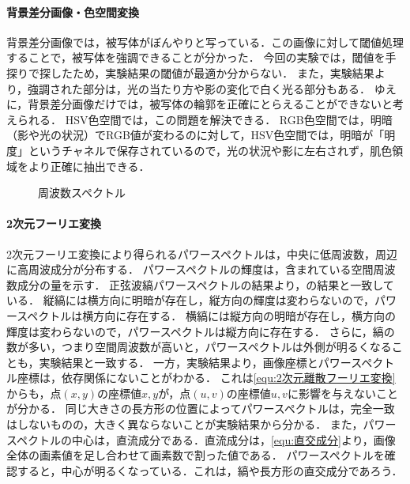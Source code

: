 \paragraph{背景差分画像・色空間変換}
背景差分画像では，被写体がぼんやりと写っている．この画像に対して閾値処理することで，被写体を強調できることが分かった．
今回の実験では，閾値を手探りで探したため，実験結果の閾値が最適か分からない．
また，実験結果より，強調された部分は，光の当たり方や影の変化で白く光る部分もある．
ゆえに，背景差分画像だけでは，被写体の輪郭を正確にとらえることができないと考えられる．
HSV色空間では，この問題を解決できる．
RGB色空間では，明暗（影や光の状況）でRGB値が変わるのに対して，HSV色空間では，明暗が「明度」というチャネルで保存されているので，光の状況や影に左右されず，肌色領域をより正確に抽出できる．
\begin{wrapfigure}{r}[0mm]{.3\textwidth}
    \centering
    \caption{周波数スペクトル}
    \label{fig:周波数スペクトル}
    \vspace{-.5cm}
\end{wrapfigure}
\paragraph{2次元フーリエ変換}
2次元フーリエ変換により得られるパワースペクトルは，中央に低周波数，周辺に高周波成分が分布する．
パワースペクトルの輝度は，含まれている空間周波数成分の量を示す．
正弦波縞パワースペクトルの結果より，の結果と一致している．
縦縞には横方向に明暗が存在し，縦方向の輝度は変わらないので，パワースペクトルは横方向に存在する．
横縞には縦方向の明暗が存在し，横方向の輝度は変わらないので，パワースペクトルは縦方向に存在する．
さらに，縞の数が多い，つまり空間周波数が高いと，パワースペクトルは外側が明るくなることも，実験結果と一致する．
一方，実験結果より，画像座標とパワースペクトル座標は，依存関係にないことがわかる．
これは\eqref{equ:2次元離散フーリエ変換}からも，点\((x,y)\)の座標値\(x,y\)が，点\((u,v)\)の座標値\(u,v\)に影響を与えないことが分かる．
同じ大きさの長方形の位置によってパワースペクトルは，完全一致はしないものの，大きく異ならないことが実験結果から分かる．
また，パワースペクトルの中心は，直流成分である．直流成分は，\eqref{equ:直交成分}より，画像全体の画素値を足し合わせて画素数で割った値である．
パワースペクトルを確認すると，中心が明るくなっている．これは，縞や長方形の直交成分であろう．
